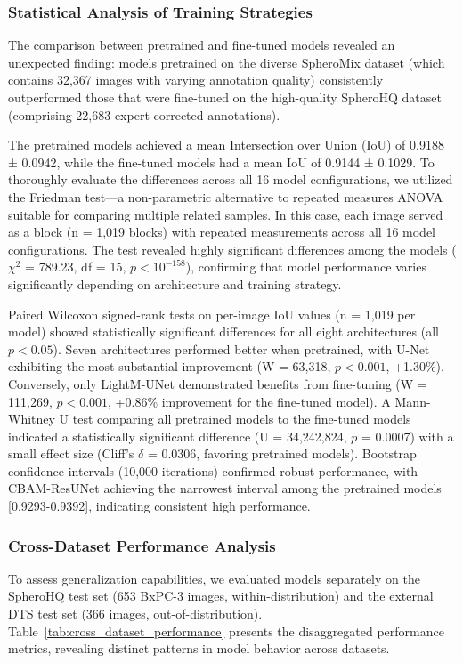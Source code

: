 \documentclass[preprint,12pt]{elsarticle}
\newcommand{\dsHQ}{SpheroHQ}
\newcommand{\dsMix}{SpheroMix}
\newcommand{\dsDTS}{DTS}
\begin{document}
\subsubsection{Statistical Analysis of Training Strategies}
The comparison between pretrained and fine-tuned models revealed an unexpected finding: models pretrained on the diverse \dsMix{} dataset (which contains 32,367 images with varying annotation quality) consistently outperformed those that were fine-tuned on the high-quality \dsHQ{} dataset (comprising 22,683 expert-corrected annotations).

The pretrained models achieved a mean Intersection over Union (IoU) of 0.9188 ± 0.0942, while the fine-tuned models had a mean IoU of 0.9144 ± 0.1029. To thoroughly evaluate the differences across all 16 model configurations, we utilized the Friedman test—a non-parametric alternative to repeated measures ANOVA suitable for comparing multiple related samples. In this case, each image served as a block (n = 1,019 blocks) with repeated measurements across all 16 model configurations. The test revealed highly significant differences among the models ($\chi^2$ = 789.23, df = 15, $p < 10^{-158}$), confirming that model performance varies significantly depending on architecture and training strategy.

Paired Wilcoxon signed-rank tests on per-image IoU values (n = 1,019 per model) showed statistically significant differences for all eight architectures (all $p < 0.05$). Seven architectures performed better when pretrained, with U-Net exhibiting the most substantial improvement (W = 63,318, $p < 0.001$, +1.30\%). Conversely, only LightM-UNet demonstrated benefits from fine-tuning (W = 111,269, $p < 0.001$, +0.86\% improvement for the fine-tuned model).
A Mann-Whitney U test comparing all pretrained models to the fine-tuned models indicated a statistically significant difference (U = 34,242,824, $p$ = 0.0007) with a small effect size (Cliff's $\delta$ = 0.0306, favoring pretrained models). Bootstrap confidence intervals (10,000 iterations) confirmed robust performance, with CBAM-ResUNet achieving the narrowest interval among the pretrained models [0.9293-0.9392], indicating consistent high performance.

\subsubsection{Cross-Dataset Performance Analysis}

To assess generalization capabilities, we evaluated models separately on the \dsHQ{} test set (653 BxPC-3 images, within-distribution) and the external \dsDTS{} test set (366 images, out-of-distribution). Table~\ref{tab:cross_dataset_performance} presents the disaggregated performance metrics, revealing distinct patterns in model behavior across datasets.
\end{document}
